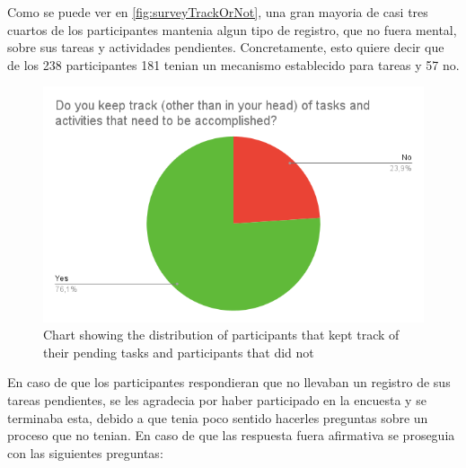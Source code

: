 Como se puede ver en \ref{fig:surveyTrackOrNot}, una gran mayoria de casi tres cuartos de los participantes mantenia algun tipo de registro, que no fuera mental, sobre sus tareas y actividades pendientes. Concretamente, esto quiere decir que de los 238 participantes 181 tenian un mecanismo establecido para tareas y 57 no.

\FloatBarrier
\begin{figure}[!htbp]
    \centering
    \includegraphics[width=15cm]{Images/General/03_user_centered_design/Survey/KeepTrack.png}
    \caption{Chart showing the distribution of participants that kept track of their pending tasks and participants that did not}
    \label{fig:survey}
\end{figure}
\FloatBarrier

En caso de que los participantes respondieran que no llevaban un registro de sus tareas pendientes, se les agradecia por haber participado en la encuesta y se terminaba esta, debido a que tenia poco sentido hacerles preguntas sobre un proceso que no tenian. En caso de que las respuesta fuera afirmativa se proseguia con las siguientes preguntas: 

